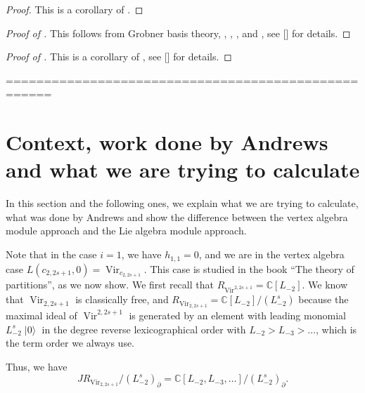 \documentclass[a4paper, 12pt, reqno]{amsart}
\theoremstyle{remark}
\DeclareMathOperator{\Vir}{Vir}
\DeclareMathOperator{\vac}{|0\rangle}
\begin{document}
\begin{proof}
  This is a corollary of .
\end{proof}

\begin{proof}[Proof of ]
  This follows from Grobner basis theory, , , ,  and , see [] for details.
\end{proof}

\begin{proof}[Proof of ]
  This is a corollary of , see [] for details.
\end{proof}

====================================================

\section{Context, work done by Andrews and what we are trying to calculate}
\label{sec:context-work-done}

In this section and the following ones, we explain what we are trying to calculate, what was done by Andrews and show the difference between the vertex algebra module approach and the Lie algebra module approach.

Note that in the case $i = 1$, we have $h_{1, 1} = 0$, and we are in the vertex algebra case $L(c_{2, 2s + 1}, 0) = \Vir_{c_{2, 2s + 1}}$.
This case is studied in the book ``The theory of partitions'', as we now show.
We first recall that $R_{\Vir^{2, 2s + 1}} = \mathbb{C}[L_{-2}]$.
We know that $\Vir_{2, 2s + 1}$ is classically free, and $R_{\Vir_{2, 2s + 1}} = \mathbb{C}[L_{-2}]/(L_{-2}^s)$ because the maximal ideal of $\Vir^{2, 2s + 1}$ is generated by an element with leading monomial $L_{-2}^s\vac$ in the degree reverse lexicographical order with $L_{-2} > L_{-3} > \dots$, which is the term order we always use.

Thus, we have 
\begin{equation*}
  JR_{\Vir_{2, 2s + 1}}/(L_{-2}^s)_{\partial} = \mathbb{C}[L_{-2}, L_{-3}, \dots]/(L_{-2}^s)_{\partial}.
\end{equation*}
\end{document}
